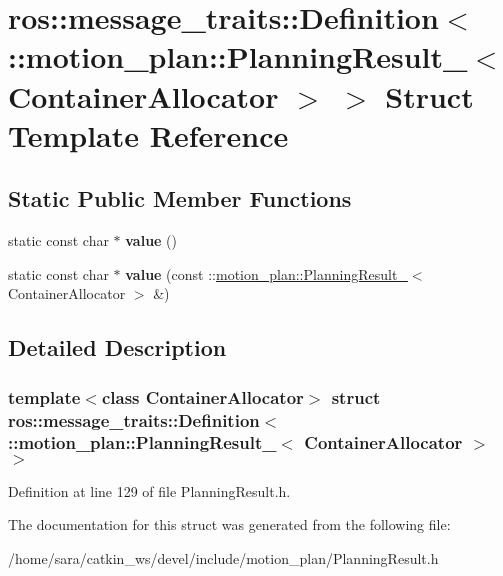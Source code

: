 \hypertarget{structros_1_1message__traits_1_1Definition_3_01_1_1motion__plan_1_1PlanningResult___3_01ContainerAllocator_01_4_01_4}{}\section{ros\+:\+:message\+\_\+traits\+:\+:Definition$<$ \+:\+:motion\+\_\+plan\+:\+:Planning\+Result\+\_\+$<$ Container\+Allocator $>$ $>$ Struct Template Reference}
\label{structros_1_1message__traits_1_1Definition_3_01_1_1motion__plan_1_1PlanningResult___3_01ContainerAllocator_01_4_01_4}
\subsection*{Static Public Member Functions}
\begin{DoxyCompactItemize}
\item 
\mbox{\label{structros_1_1message__traits_1_1Definition_3_01_1_1motion__plan_1_1PlanningResult___3_01ContainerAllocator_01_4_01_4_a59e4a143330b0465d0b54df3efa8fa07}} 
static const char $\ast$ {\bfseries value} ()
\item 
\mbox{\label{structros_1_1message__traits_1_1Definition_3_01_1_1motion__plan_1_1PlanningResult___3_01ContainerAllocator_01_4_01_4_a51d1a73478354b46f873bff44e59e77f}} 
static const char $\ast$ {\bfseries value} (const \+::\hyperlink{structmotion__plan_1_1PlanningResult__}{motion\+\_\+plan\+::\+Planning\+Result\+\_\+}$<$ Container\+Allocator $>$ \&)
\end{DoxyCompactItemize}


\subsection{Detailed Description}
\subsubsection*{template$<$class Container\+Allocator$>$\newline
struct ros\+::message\+\_\+traits\+::\+Definition$<$ \+::motion\+\_\+plan\+::\+Planning\+Result\+\_\+$<$ Container\+Allocator $>$ $>$}



Definition at line 129 of file Planning\+Result.\+h.



The documentation for this struct was generated from the following file\+:\begin{DoxyCompactItemize}
\item 
/home/sara/catkin\+\_\+ws/devel/include/motion\+\_\+plan/Planning\+Result.\+h\end{DoxyCompactItemize}

